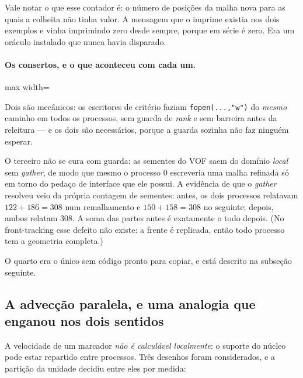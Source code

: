 Vale notar o que esse contador \'e: o n\'umero de posi\c{c}\~oes da malha nova
para as quais a colheita n\~ao tinha valor. A mensagem que o imprime existia nos
dois exemplos e vinha imprimindo zero desde sempre, porque em s\'erie \'e zero.
Era um or\'aculo instalado que nunca havia disparado.

\paragraph{Os consertos, e o que aconteceu com cada um.}\mbox{}

\begin{adjustbox}{max width=\linewidth}
\end{adjustbox}

Dois s\~ao mec\^anicos: os escritores de crit\'erio faziam
\texttt{fopen(...,"w")} do \emph{mesmo} caminho em todos os processos, sem guarda
de \emph{rank} e sem barreira antes da releitura --- e os dois s\~ao necess\'arios,
porque a guarda sozinha n\~ao faz ningu\'em esperar.

O terceiro n\~ao se cura com guarda: as sementes do VOF saem do dom\'inio
\emph{local} sem \emph{gather}, de modo que mesmo o processo 0 escreveria uma
malha refinada s\'o em torno do peda\c{c}o de interface que ele possui. A
evid\^encia de que o \emph{gather} resolveu veio da pr\'opria contagem de
sementes: antes, os dois processos relatavam $122+186=308$ num remalhamento e
$150+158=308$ no seguinte; depois, ambos relatam 308. A soma das partes antes \'e
exatamente o todo depois. (No front-tracking esse defeito n\~ao existe: a frente
\'e replicada, ent\~ao todo processo tem a geometria completa.)

O quarto era o \'unico sem c\'odigo pronto para copiar, e est\'a descrito na
subse\c{c}\~ao seguinte.

\subsection{A advec\c{c}\~ao paralela, e uma analogia que enganou nos dois sentidos}
\label{sec:posse}

A velocidade de um marcador \emph{n\~ao \'e calcul\'avel localmente}: o suporte do
n\'ucleo pode estar repartido entre processos. Tr\^es desenhos foram considerados,
e a parti\c{c}\~ao da unidade decidiu entre eles por medida:

